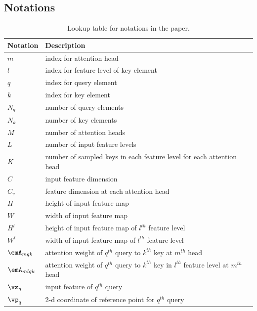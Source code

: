 \clearpage

\subsection{Notations}

\begin{table}[ht]
\caption{Lookup table for notations in the paper.}
\label{notations_lookup}
\begin{center}
\begin{tabular}{ll}
\Xhline{2\arrayrulewidth}
Notation           & Description \\
\hline
$m$                & index for attention head \\
$l$                & index for feature level of key element \\
$q$                & index for query element \\
$k$                & index for key element \\
$N_q$              & number of query elements \\
$N_k$              & number of key elements \\
$M$                & number of attention heads \\
$L$                & number of input feature levels \\
$K$                & number of sampled keys in each feature level for each attention head \\
$C$                & input feature dimension \\
$C_v$              & feature dimension at each attention head \\
$H$                & height of input feature map \\
$W$                & width of input feature map \\
$H^l$              & height of input feature map of $l^{th}$ feature level \\
$W^l$              & width of input feature map of $l^{th}$ feature level \\
$\emA_{mqk}$       & attention weight of $q^{th}$ query to $k^{th}$ key at $m^{th}$ head \\
$\emA_{mlqk}$      & attention weight of $q^{th}$ query to $k^{th}$ key in $l^{th}$ feature level at $m^{th}$ head \\
$\vz_q$            & input feature of $q^{th}$ query \\
$\vp_q$            & 2-d coordinate of reference point for $q^{th}$ query \\

\end{tabular}
\end{center}
\end{table}
